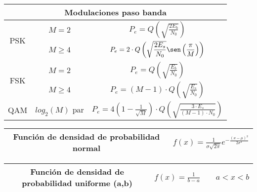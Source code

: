 \documentclass[12pt,es,blanco]{uah}
\begin{document}
\begin{center}
    \renewcommand{\arraystretch}{2.2}
        \begin{tabular}{|c|c|c|}
            \multicolumn{3}{c}{{\bf Modulaciones paso banda}}\\
            \hline
            \multirow{2}{*}{PSK} & $M=2$ & $P_e = Q\left ( \displaystyle\sqrt{\displaystyle\frac{2 E_b}{N_0}} \right)$ \\[1ex]
            \cline{2-3}
            & $M \geq 4$ & $P_e = 2 \cdot Q\left ( \sqrt{\displaystyle\frac{2 E_s}{N_0}} \sen\left ( \displaystyle\frac{\pi}{M} \right)  \right)$ \\
            \hline
            \multirow{2}{*}{FSK} & $M=2$ & $P_e = Q\left ( \sqrt{\displaystyle\frac{E_b}{N_0}} \right)$ \\
            \cline{2-3}
            & $M\geq 4$ & $P_e = (M-1) \cdot Q\left ( \sqrt{\displaystyle\frac{E_s}{N_0}} \right)$ \\
            \hline
            QAM & $log_2(M)$ par & $P_e = 4 \left ( 1 - \displaystyle\frac{1}{\sqrt{M}} \right ) \cdot Q\left ( \sqrt{\displaystyle\frac{3 \cdot E_s}{(M-1) \cdot N_0}} \right)$ \\
            \hline
        \end{tabular}
        \renewcommand{\arraystretch}{1}
        \vspace{0.5cm}

    \renewcommand{\arraystretch}{2}
        \begin{tabular}{|c|c|}
            \hline 
            Función de densidad de probabilidad normal & $f(x) = \displaystyle\frac{1}{\sigma \sqrt{2 \pi}} e^{- \displaystyle\frac{(x - \mu)^2}{2 \sigma^2}}$ \\
            \hline
        \end{tabular}
    \renewcommand{\arraystretch}{1}
    \vspace{0.5cm}

    \renewcommand{\arraystretch}{2}
        \begin{tabular}{|c|c|}
            \hline 
            Función de densidad de probabilidad uniforme (a,b) & $f(x) = \frac{1}{b-a} \qquad a < x < b$ \\
            \hline
        \end{tabular}
    \renewcommand{\arraystretch}{1}
    \vspace{0.5cm}
    

\end{center}
\end{document}
